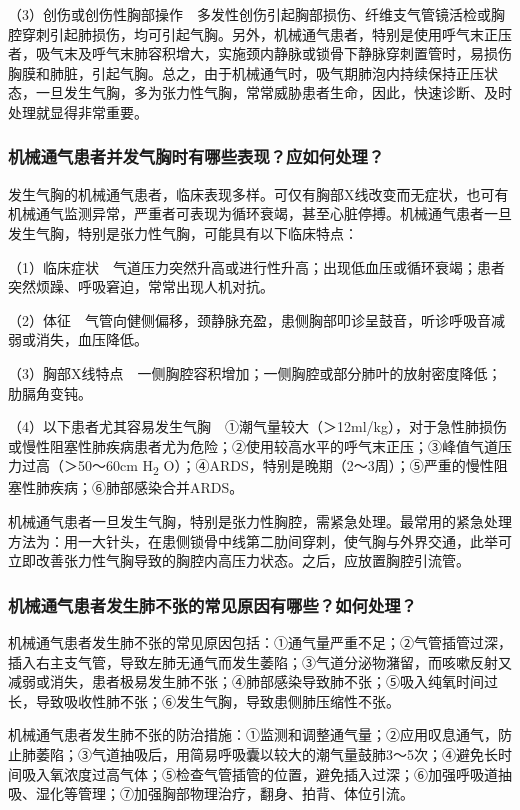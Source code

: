 （3）创伤或创伤性胸部操作　多发性创伤引起胸部损伤、纤维支气管镜活检或胸腔穿刺引起肺损伤，均可引起气胸。另外，机械通气患者，特别是使用呼气末正压者，吸气末及呼气末肺容积增大，实施颈内静脉或锁骨下静脉穿刺置管时，易损伤胸膜和肺脏，引起气胸。总之，由于机械通气时，吸气期肺泡内持续保持正压状态，一旦发生气胸，多为张力性气胸，常常威胁患者生命，因此，快速诊断、及时处理就显得非常重要。

\subsubsection{机械通气患者并发气胸时有哪些表现？应如何处理？}

发生气胸的机械通气患者，临床表现多样。可仅有胸部X线改变而无症状，也可有机械通气监测异常，严重者可表现为循环衰竭，甚至心脏停搏。机械通气患者一旦发生气胸，特别是张力性气胸，可能具有以下临床特点：

（1）临床症状　气道压力突然升高或进行性升高；出现低血压或循环衰竭；患者突然烦躁、呼吸窘迫，常常出现人机对抗。

（2）体征　气管向健侧偏移，颈静脉充盈，患侧胸部叩诊呈鼓音，听诊呼吸音减弱或消失，血压降低。

（3）胸部X线特点　一侧胸腔容积增加；一侧胸腔或部分肺叶的放射密度降低；肋膈角变钝。

（4）以下患者尤其容易发生气胸　①潮气量较大（＞12ml/kg），对于急性肺损伤或慢性阻塞性肺疾病患者尤为危险；②使用较高水平的呼气末正压；③峰值气道压力过高（＞50～60cm
H\textsubscript{2}
O）；④ARDS，特别是晚期（2～3周）；⑤严重的慢性阻塞性肺疾病；⑥肺部感染合并ARDS。

机械通气患者一旦发生气胸，特别是张力性胸腔，需紧急处理。最常用的紧急处理方法为：用一大针头，在患侧锁骨中线第二肋间穿刺，使气胸与外界交通，此举可立即改善张力性气胸导致的胸腔内高压力状态。之后，应放置胸腔引流管。

\subsubsection{机械通气患者发生肺不张的常见原因有哪些？如何处理？}

机械通气患者发生肺不张的常见原因包括：①通气量严重不足；②气管插管过深，插入右主支气管，导致左肺无通气而发生萎陷；③气道分泌物潴留，而咳嗽反射又减弱或消失，患者极易发生肺不张；④肺部感染导致肺不张；⑤吸入纯氧时间过长，导致吸收性肺不张；⑥发生气胸，导致患侧肺压缩性不张。

机械通气患者发生肺不张的防治措施：①监测和调整通气量；②应用叹息通气，防止肺萎陷；③气道抽吸后，用简易呼吸囊以较大的潮气量鼓肺3～5次；④避免长时间吸入氧浓度过高气体；⑤检查气管插管的位置，避免插入过深；⑥加强呼吸道抽吸、湿化等管理；⑦加强胸部物理治疗，翻身、拍背、体位引流。

